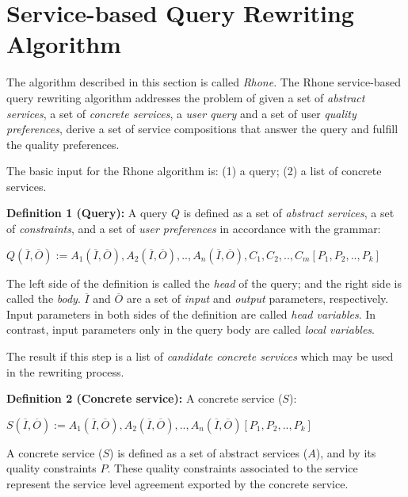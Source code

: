\section{Service-based Query Rewriting Algorithm}
The algorithm described in this section is called \textit{Rhone}. 
The Rhone service-based query rewriting algorithm addresses the problem of given
a set of \textit{abstract services}, a set of \textit{concrete services}, a
\textit{user query} and a set of user \textit{quality preferences}, derive a set
of service compositions that answer the query and fulfill the quality preferences.

The basic input for the Rhone algorithm is: (1) a query; (2) a list of concrete services.

\bigskip
\noindent \textbf{Definition 1 (Query):} 
A query $Q$ is defined as a set of \textit{abstract services}, a set of \textit{constraints}, and a set of \textit{user preferences} in accordance with the grammar: 
\begin{center}
$Q (\overline{I}, \overline{O}) := A_{1}(\overline{I}, \overline{O}), A_{2}(\overline{I}, \overline{O}), ..,  A_{n}(\overline{I}, \overline{O}),C_{1},C_{2}, .., C_{m}[P_{1},P_{2}, .., P_{k}]$
\end{center}  

The left side of the definition is called the \textit{head} of the query; and the right side is called the \textit{body}. 
$\overline{I}$ and $\overline{O}$ are a set of \textit{input} and \textit{output} parameters, respectively.
Input parameters in both sides of the definition are called \textit{head variables}.
In contrast, input parameters only in the query body are called \textit{local variables}.

The result if this step is a list of \textit{candidate concrete services} which
 may be used in the rewriting process.

\bigskip
\noindent \textbf{Definition 2 (Concrete service):} A concrete service ($S$):
\begin{center}
$S (\overline{I}, \overline{O}) := A_{1}(\overline{I}, \overline{O}), A_{2}(\overline{I}, \overline{O}), ..,  A_{n}(\overline{I}, \overline{O})[P_{1},P_{2}, .., P_{k}]$
\end{center}  

A concrete service ($S$) is defined as a set of abstract services ($A$), and by its quality constraints $P$. 
These quality constraints associated to the service represent the service level agreement exported by the concrete service.


